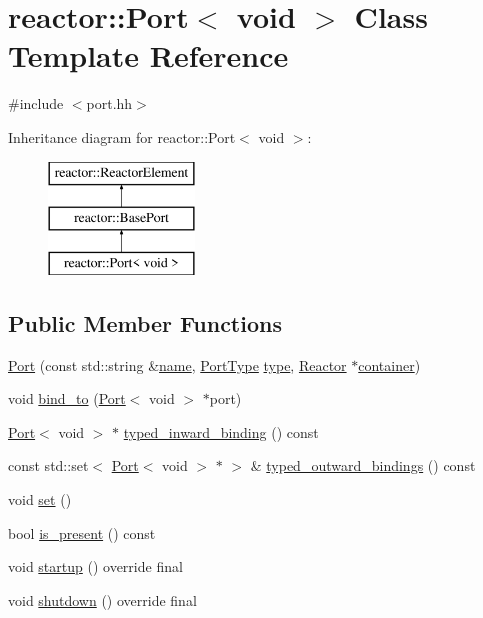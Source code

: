 \hypertarget{classreactor_1_1Port_3_01void_01_4}{}\section{reactor\+:\+:Port$<$ void $>$ Class Template Reference}
\label{classreactor_1_1Port_3_01void_01_4}


{\ttfamily \#include $<$port.\+hh$>$}

Inheritance diagram for reactor\+:\+:Port$<$ void $>$\+:\begin{figure}[H]
\begin{center}
\leavevmode
\includegraphics[height=3.000000cm]{classreactor_1_1Port_3_01void_01_4}
\end{center}
\end{figure}
\subsection*{Public Member Functions}
\begin{DoxyCompactItemize}
\item 
\hyperlink{classreactor_1_1Port_3_01void_01_4_a2114887bc779a8f035dcf0e21eabd5fd}{Port} (const std\+::string \&\hyperlink{classreactor_1_1ReactorElement_a99579f61dbaf5d5d98aebfe26eb8bf77}{name}, \hyperlink{namespacereactor_a08c8e2d85e5bc706b1af8a87e40eec6d}{Port\+Type} \hyperlink{classreactor_1_1BasePort_a9af5e0d55ee1a425b2c5975ab1ca871e}{type}, \hyperlink{classreactor_1_1Reactor}{Reactor} $\ast$\hyperlink{classreactor_1_1ReactorElement_a25bf298de879a82eefc1ba426be05812}{container})
\item 
void \hyperlink{classreactor_1_1Port_3_01void_01_4_a86c25528d080fe3d1bba83878fd53860}{bind\+\_\+to} (\hyperlink{classreactor_1_1Port}{Port}$<$ void $>$ $\ast$port)
\item 
\hyperlink{classreactor_1_1Port}{Port}$<$ void $>$ $\ast$ \hyperlink{classreactor_1_1Port_3_01void_01_4_aa50594b9d98fa93219adf8330ed76131}{typed\+\_\+inward\+\_\+binding} () const
\item 
const std\+::set$<$ \hyperlink{classreactor_1_1Port}{Port}$<$ void $>$ $\ast$ $>$ \& \hyperlink{classreactor_1_1Port_3_01void_01_4_a8f9bdc0b6bace7d1a05615b28cf43717}{typed\+\_\+outward\+\_\+bindings} () const
\item 
void \hyperlink{classreactor_1_1Port_3_01void_01_4_afe579f1f5b555a15703c9a05d28bea03}{set} ()
\item 
bool \hyperlink{classreactor_1_1Port_3_01void_01_4_a9f7a92606f6f4600b85fd4680de7007d}{is\+\_\+present} () const
\item 
void \hyperlink{classreactor_1_1Port_3_01void_01_4_a3a84b8d17b1a43197a753847b0df1777}{startup} () override final
\item 
void \hyperlink{classreactor_1_1Port_3_01void_01_4_ad7d9028d091509215b3685e4af95cb03}{shutdown} () override final
\end{DoxyCompactItemize}
